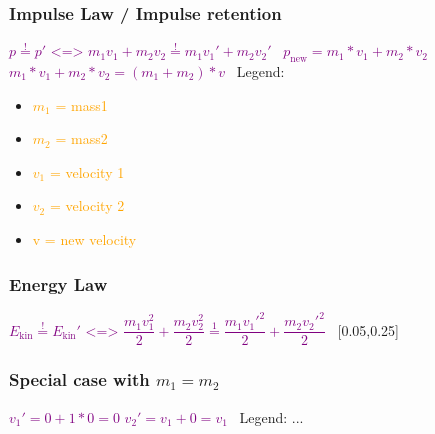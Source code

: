 \documentclass[main.tex,fontsize=8pt,paper=a4,paper=portrait,DIV=calc,]{scrartcl}
\begin{document}
\begin{multicols*}{2}
\subsubsection{Impulse Law / Impulse retention}
\vspace{2mm}
\large \textcolor{purple}{\( p \overset{!}{=} p' \text{ <=> } m_1v_1 + m_2v_2 \overset{!}{=} m_1v_1' + m_2v_2' \)}\newline
\, \newline
\large \textcolor{purple}{\(p_{\text{new}} = m_1*v_1 + m_2*v_2 \)}\newline
\, \newline
\large \textcolor{purple}{\(m_1*v_1 + m_2*v_2 = (m_1 + m_2) * v\)}\newline
\normalsize \, \newline
Legend:\newline
\begin{itemize}
\item \textcolor{orange}{\(m_1\) = mass1}
\item \textcolor{orange}{\(m_2\) = mass2}
\item \textcolor{orange}{\(v_1\) = velocity 1}
\item \textcolor{orange}{\(v_2\) = velocity 2}
\item \textcolor{orange}{v = new velocity}
\end{itemize} 
\subsubsection{Energy Law}
\vspace{2mm}
\large \textcolor{purple}{\( E_{\text{kin}} \overset{!}{=} E_{\text{kin}}' \text{ <=> } \dfrac{m_1v_1^2}{2} + \dfrac{m_2v_2^2}{2} \overset{1}{=} \dfrac{m_1v_1'^2}{2} + \dfrac{m_2v_2'^2}{2} \)}\newline
\normalsize \, \newline
{}[0.05,0.25]

\subsubsection{Special case with \(m_1 = m_2\)}
\vspace{2mm}
\large \textcolor{purple}{\( v_1' = 0 + 1 * 0 = 0 \)}\newline
\textcolor{purple}{\( v_2' = v_1 + 0 = v_1\)}\newline
\normalsize \, \newline
Legend: \newline
...



\end{multicols*}
\end{document}
